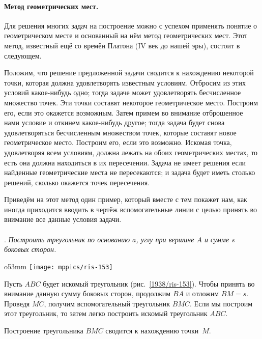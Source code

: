 \paragraph{Метод геометрических мест.}\label{1938/133}
Для решения многих задач на построение можно с успехом применять понятие о геометрическом месте и основанный на нём метод геометрических мест.
Этот метод, известный ещё со времён Платона (IV век до нашей эры), состоит в следующем.

Положим, что решение предложенной задачи сводится к нахождению некоторой точки, которая должна удовлетворять известным условиям.
Отбросим из этих условий какое-нибудь одно;
тогда задаче может удовлетворять бесчисленное множество точек.
Эти точки составят некоторое геометрическое место.
Построим его, если это окажется возможным.
Затем примем во внимание отброшенное нами условие и откинем какое-нибудь другое;
тогда задача будет снова удовлетворяться бесчисленным множеством точек, которые составят новое геометрическое место.
Построим его, если это возможно.
Искомая точка, удовлетворяя всем условиям, должна лежать на обоих геометрических местах, то есть она должна находиться в их пересечении.
Задача не имеет решения если найденные геометрические места не пересекаются;
и задача будет иметь столько решений, сколько окажется точек пересечения.

Приведём на этот метод один пример, который вместе с тем покажет нам, как иногда приходится вводить в чертёж вспомогательные линии с целью принять во внимание все данные условия задачи.

\paragraph{}\label{1938/134}
.
\emph{Построить треугольник по основанию $a$, углу при вершине $A$ и сумме $s$ боковых сторон.}

\begin{wrapfigure}{o}{53mm}
\centering
\texttt{[image: mppics/ris-153]}
\caption{}\label{1938/ris-153}
\end{wrapfigure}

Пусть $ABC$ будет искомый треугольник (рис.~\ref{1938/ris-153}).
Чтобы принять во внимание данную сумму боковых сторон, продолжим $BA$ и отложим $BM=s$.
Проведя $MC$, получим вспомогательный треугольник $BMC$.
Если мы построим этот треугольник, то затем легко построить искомый треугольник $ABC$.

Построение треугольника $BMC$ сводится к нахождению точки~$M$.

